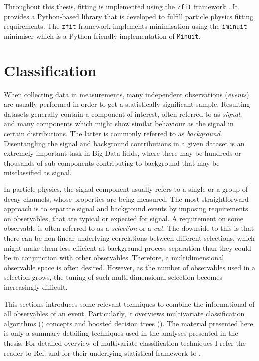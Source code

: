 Throughout this thesis, fitting is implemented using the \texttt{zfit} framework \cite{ESCHLE2020100508}. 
It provides a Python-based library that is developed to fulfill particle physics fitting requirements.
The \texttt{zfit} framework implements minimisation using the \texttt{iminuit} minimiser \cite{iminuit} which is a Python-friendly implementation of \texttt{Minuit}.

\section{Classification}\label{sec:classification}
When collecting data in measurements, many independent observations (\textit{events}) are usually performed in order to get a statistically significant sample.
Resulting datasets generally contain a component of interest, often referred to as \textit{signal}, and many components which might show similar behaviour as the signal in certain distributions. 
The latter is commonly referred to as \textit{background}. Disentangling the signal and background contributions in a given dataset is an extremely important task in Big-Data fields, where there may be hundreds or thousands of sub-components contributing to background that may be misclassified as signal.

In particle physics, the signal component usually refers to a single or a group of decay channels, whose properties are being measured. 
The most straightforward approach is to separate signal and background events by imposing requirements on observables, that are typical or expected for signal.
A requirement on some observable is often referred to as a \textit{selection} or a \textit{cut}.
The downside to this is that there can be non-linear underlying correlations between different selections, which might make them less efficient at background process separation than they could be in conjunction with other observables. 
Therefore, a multidimensional observable space is often desired.
However, as the number of observables used in a selection grows, the tuning of such multi-dimensional selection becomes increasingly difficult.


This sections introduces some relevant techniques to combine the informational of all observables of an event. 
Particularly, it overviews multivariate classification algorithms () concepts and boosted decision trees (). 
The material presented here is only a summary detailing techniques used in the analyses presented in the thesis.
For detailed overview of multivariate-classification techniques I refer the reader to Ref.\cite{Behnke:2013pga} and for their underlying statistical framework to \cite{Hastie_Tibshirani_Friedman_2001,bishop_2016}.
